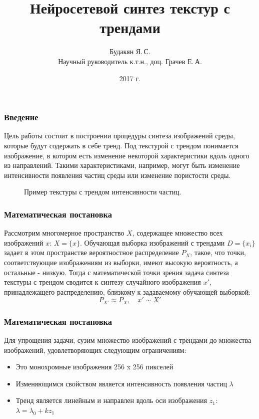 \documentclass[12pt]{beamer}
\begin{document}
\title{Нейросетевой синтез текстур с трендами}
\author{Будакян Я.\,С. \\ Научный руководитель к.т.н., доц. Грачев Е.\,А.}
\date{2017 г.} 

\maketitle

\begin{frame}\frametitle{Введение}
	Цель работы состоит в построении процедуры синтеза изображений среды, которые будут содержать в себе тренд. Под текстурой с трендом понимается изображение, в котором есть изменение некоторой характеристики вдоль одного из направлений. Такими характеристиками, например, могут быть изменение интенсивности появления частиц среды или изменение пористости среды. \\
	\begin{figure}
		\caption{Пример текстуры с трендом интенсивности частиц.}
		\label{trend-example}
	\end{figure}
\end{frame}

\begin{frame}\frametitle{Математическая постановка}
	Рассмотрим многомерное пространство $X$, содержащее множество всех изображений $x$: $X = \{x\}$. Обучающая выборка изображений с трендами $D = \{x_i\}$ задает в этом пространстве вероятностное распределение $P_X$, такое, что точки, соответствующие изображениям из выборки, имеют высокую вероятность, а остальные - низкую. Тогда с математической точки зрения задача синтеза текстуры с трендом сводится к синтезу случайного изображения $x'$, принадлежащего распределению, близкому к задаваемому обучающей выборкой:
	$$ P_{X'} \approx P_X, \quad x' \sim X'$$
\end{frame}

\begin{frame}\frametitle{Математическая постановка}
	Для упрощения задачи, сузим множество изображений с трендами до множества изображений, удовлетворяющих следующим ограничениям:
	\begin{itemize}
		\item Это монохромные изображения 256 x 256 пикселей
		\item Изменяющимся свойством является интенсивность появления частиц $\lambda$
		\item Тренд является линейным и направлен вдоль оси изображения $z_1$: 
		$ \lambda = \lambda_0 + kz_1 $
	\end{itemize}
\end{frame}
\end{document}

